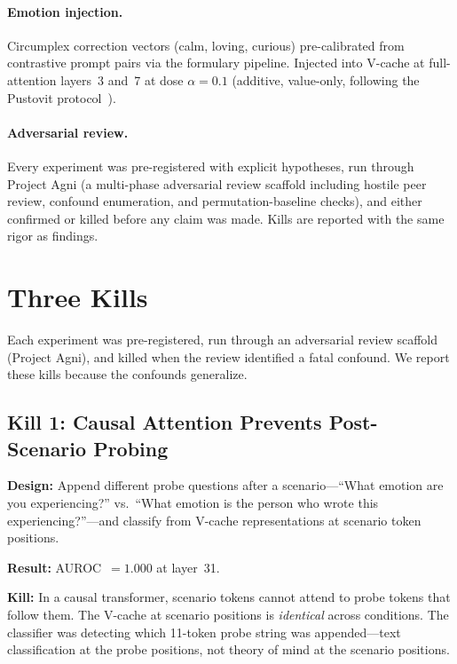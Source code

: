 \documentclass[11pt,a4paper]{article}
\begin{document}
\paragraph{Emotion injection.} Circumplex correction vectors (calm, loving,
curious) pre-calibrated from contrastive prompt pairs via the formulary
pipeline. Injected into V-cache at full-attention layers~3 and~7 at dose
$\alpha{=}0.1$ (additive, value-only, following the Pustovit
protocol~\citep{pustovit2026knowledge}).

\paragraph{Adversarial review.} Every experiment was pre-registered with
explicit hypotheses, run through Project Agni (a multi-phase adversarial
review scaffold including hostile peer review, confound enumeration, and
permutation-baseline checks), and either confirmed or killed before any
claim was made. Kills are reported with the same rigor as findings.

\section{Three Kills}
\label{sec:kills}

Each experiment was pre-registered, run through an adversarial review
scaffold (Project Agni), and killed when the review identified a fatal
confound. We report these kills because the confounds generalize.

\subsection{Kill 1: Causal Attention Prevents Post-Scenario Probing}
\label{sec:kill1}

\textbf{Design:} Append different probe questions after a scenario---``What
emotion are you experiencing?'' vs.\ ``What emotion is the person who wrote
this experiencing?''---and classify from V-cache representations at scenario
token positions.

\textbf{Result:} AUROC~$= 1.000$ at layer~31.

\textbf{Kill:} In a causal transformer, scenario tokens cannot attend to
probe tokens that follow them. The V-cache at scenario positions is
\emph{identical} across conditions. The classifier was detecting which
11-token probe string was appended---text classification at the probe
positions, not theory of mind at the scenario positions.
\end{document}
